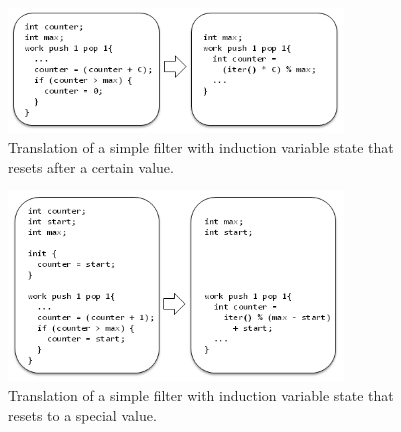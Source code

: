 %
%  
%
%
%
%
%
%    
%
%


\begin{figure}[t]
\includegraphics[width=3.5in]{transformation1.png}
\caption{Translation of a simple filter with induction variable state that resets after a certain value. \protect\label{fig:transform-after-simple}}
\end{figure}

\begin{figure}[t]
\includegraphics[width=3.5in]{transformation2.png}
\caption{Translation of a simple filter with induction variable state that resets to a special value. \protect\label{fig:transform-after-start}}
\end{figure}

